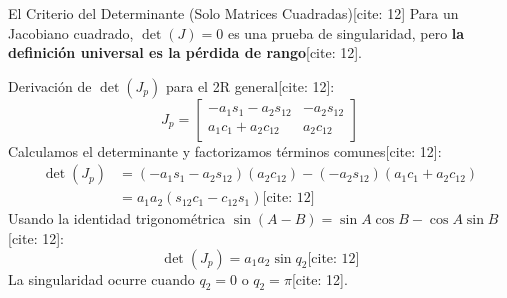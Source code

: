 \documentclass[aspectratio=169, xcolor={table,xcdraw}]{beamer}
\begin{document}
\begin{frame}{El Criterio del Determinante (Solo Matrices Cuadradas)[cite: 12]}
    \small
    Para un Jacobiano cuadrado, $\det(J) = 0$ es una prueba de singularidad, pero \textbf{la definición universal es la pérdida de rango}[cite: 12].
    
    Derivación de $\det(J_p)$ para el 2R general[cite: 12]:
    \begin{equation*}
        J_p = \begin{bmatrix} -a_1 s_1 - a_2 s_{12} & -a_2 s_{12} \\ a_1 c_1 + a_2 c_{12} & a_2 c_{12} \end{bmatrix}
    \end{equation*}
    Calculamos el determinante y factorizamos términos comunes[cite: 12]:
    \begin{align*}
        \det(J_p) &= (-a_1 s_1 - a_2 s_{12})(a_2 c_{12}) - (-a_2 s_{12})(a_1 c_1 + a_2 c_{12}) \\
        &= a_1 a_2 (s_{12} c_1 - c_{12} s_1) \text{[cite: 12]}
    \end{align*}
    Usando la identidad trigonométrica $\sin(A-B) = \sin A \cos B - \cos A \sin B$[cite: 12]:
    \begin{equation*}
        \boxed{\det(J_p) = a_1 a_2 \sin q_2} \text{[cite: 12]}
    \end{equation*}
    La singularidad ocurre cuando $q_2 = 0$ o $q_2 = \pi$[cite: 12].
\end{frame}
\end{document}

